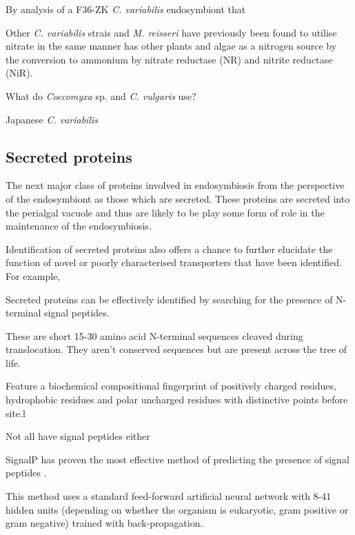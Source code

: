 By analysis of a F36-ZK \textit{C. variabilis} \citep{Hoshina2010} endosymbiont
that 


Other \textit{C. variabilis} strais 
and \textit{M. reisseri} have previously been found to utilise nitrate 
in the same manner has other plants and algae as a nitrogen
source by the conversion to ammonium by nitrate reductase (NR)
and nitrite reductase (NiR).


What do \textit{Coccomyxa} sp. and \textit{C. vulgaris} use?



Japanese \textit{C. variabilis} 



\subsection{Secreted proteins}

The next major class of proteins involved in endosymbiosis
from the perspective of the endosymbiont as those
which are secreted.   These proteins are secreted
into the perialgal vacuole and thus are likely to
be play some form of role in the maintenance of
the endosymbiosis.


Identification of secreted proteins also offers
a chance to further elucidate the function of novel or poorly 
characterised transporters that have been identified. 
For example, 

Secreted proteins can be effectively identified by 
searching for the presence of N-terminal signal peptides. 

These are short 15-30 amino acid N-terminal sequences cleaved during translocation.
They aren't conserved sequences but are present across the tree of life.

Feature a biochemical compositional fingerprint 
of positively charged residues, hydrophobic residues and polar uncharged
residues with distinctive points before site.l \citep{Emanuelsson2007}





Not all have signal peptides either





SignalP \citep{Nielsen1997} has proven the most effective method of predicting
the presence of signal peptides \citep{Lee2009a,Petersen2011}.


This method uses a standard feed-forward artificial neural network
with 8-41 hidden units (depending on whether the organism is eukaryotic, 
gram positive or gram negative) trained with back-propagation.





